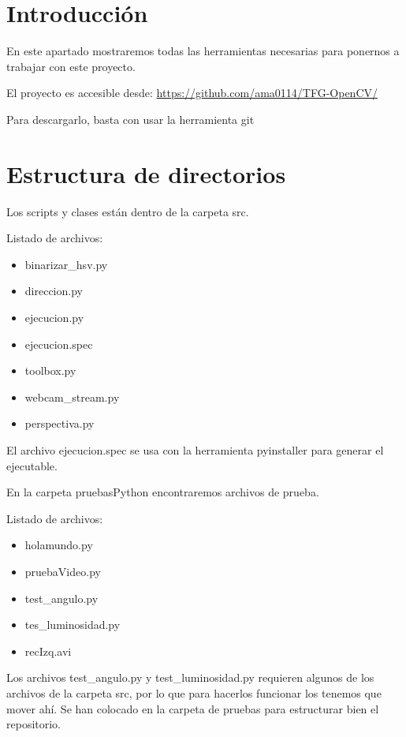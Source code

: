 
\section{Introducción}
En este apartado mostraremos todas las herramientas necesarias para ponernos a trabajar con este proyecto.

El proyecto es accesible desde: \url{https://github.com/ama0114/TFG-OpenCV/}

Para descargarlo, basta con usar la herramienta git\cite{git}

\section{Estructura de directorios}
Los scripts y clases están dentro de la carpeta src. 

Listado de archivos:
\begin{itemize}

	\item binarizar\_hsv.py
	\item direccion.py
	\item ejecucion.py
	\item ejecucion.spec
	\item toolbox.py
	\item webcam\_stream.py
	\item perspectiva.py
	
\end{itemize}

El archivo ejecucion.spec se usa con la herramienta pyinstaller para generar el ejecutable. 

En la carpeta pruebasPython encontraremos archivos de prueba.

Listado de archivos:
\begin{itemize}

	\item holamundo.py
	\item pruebaVideo.py
	\item test\_angulo.py
	\item tes\_luminosidad.py
	\item recIzq.avi
	
\end{itemize}

Los archivos test\_angulo.py y test\_luminosidad.py requieren algunos de los archivos de la carpeta src, por lo que para hacerlos funcionar los tenemos que mover ahí. Se han colocado en la carpeta de pruebas para estructurar bien el repositorio.

